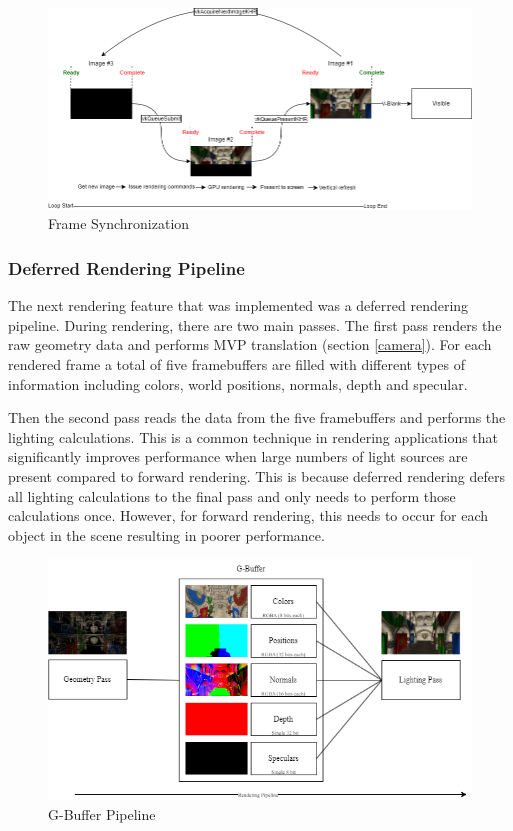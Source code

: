 \documentclass[11pt]{article}
\begin{document}
\begin{figure}[h!]
  \centering
  \includegraphics[width=\textwidth]{images/frame_sync.png}
  \caption{Frame Synchronization}
  \label{fig:frame_sync}
\end{figure}

\subsubsection{Deferred Rendering Pipeline}
The next rendering feature that was implemented was a deferred rendering
pipeline. During rendering, there are two main passes. The first pass renders
the raw geometry data and performs MVP translation (section \ref{camera}). For
each rendered frame a total of five framebuffers are filled with different types of
information including colors, world positions, normals, depth and specular.

Then the second pass reads the data from the five framebuffers and performs the
lighting calculations. This is a common technique in rendering applications that
significantly improves performance when large numbers of light sources are
present compared to forward rendering. This is because deferred rendering defers
all lighting calculations to the final pass and only needs to perform those
calculations once. However, for forward rendering, this needs to occur for each
object in the scene resulting in poorer performance.

\begin{figure}[h!]
  \centering
  \includegraphics[width=\textwidth]{images/g_buffer.png}
  \caption{G-Buffer Pipeline}
  \label{fig:g_buffer}
\end{figure}
\end{document}
